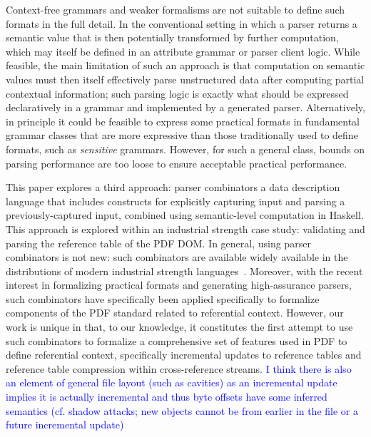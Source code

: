 Context-free grammars and weaker formalisms are not suitable to define
such formats in the full detail.
%
In the conventional setting in which a parser returns a semantic value
that is then potentially transformed by further computation, which may
itself be defined in an attribute grammar or parser client logic.
%
While feasible, the main limitation of such an approach is that
computation on semantic values must then itself effectively parse
unstructured data after computing partial contextual information;
%
such parsing logic is exactly what should be expressed declaratively
in a grammar and implemented by a generated parser.
%
Alternatively, in principle it could be feasible to express some
practical formats in fundamental grammar classes that are more
expressive than those traditionally used to define formats, such as
\emph{sensitive} grammars.
%
However, for such a general class, bounds on parsing performance are
too loose to ensure acceptable practical performance.

This paper explores a third approach: parser combinators a data
description language that includes constructs for explicitly capturing
input and parsing a previously-captured input, combined using
semantic-level computation in Haskell.
%
This approach is explored within an industrial strength case study:
validating and parsing the reference table of the PDF DOM.
%
In general, using parser combinators is not new: such combinators are
available widely available in the distributions of modern industrial
strength languages~.
%
Moreover, with the recent interest in formalizing practical formats
and generating high-assurance parsers, such combinators have
specifically been applied specifically to formalize components of the
PDF standard related to referential context.
%
However, our work is unique in that, to our knowledge, it constitutes
the first attempt to use such combinators to formalize a comprehensive
set of features used in PDF to define referential context,
specifically incremental updates to reference tables and reference
table compression within cross-reference streams.
\textcolor{blue}{I think there is also an element of general file layout (such as cavities) as an incremental update implies it is actually incremental and thus byte offsets have some inferred semantics (cf. shadow attacks; new objects cannot be from earlier in the file or a future incremental update)} 

